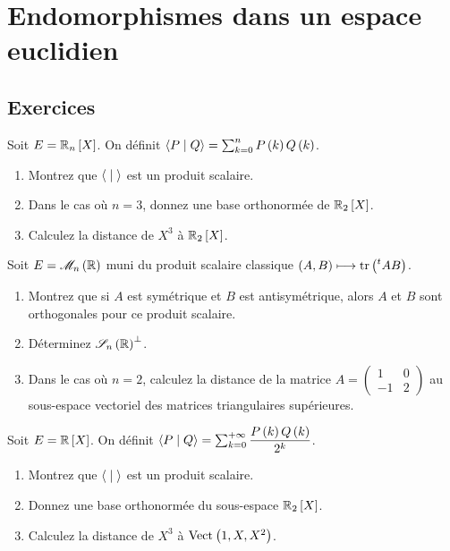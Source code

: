 \chapter{Endomorphismes dans un espace euclidien}

\minitoc

\section*{Exercices}

\legendeexercices

\begin{exos}
Soit \(E=\polydeg[\R]{n}\). On définit \(\left\langle P\;\middle|\; Q\right\rangle=\sum_{k=0}^nP\left(k\right)Q\left(k\right)\).

\begin{enumerate}
    \item Montrez que \(\left\langle\;\middle|\;\right\rangle\) est un produit scalaire. \\
    \item Dans le cas où \(n=3\), donnez une base orthonormée de \(\polydeg[\R]{2}\). \\
    \item Calculez la distance de \(X^3\) à \(\polydeg[\R]{2}\).
\end{enumerate}
\end{exos}

\begin{exos}
Soit \(E=\M{n}[\R]\) muni du produit scalaire classique \(\left(A,B\right)\longmapsto\operatorname{tr}\left(\prescript{t}{}{A}B\right)\).

\begin{enumerate}
    \item Montrez que si \(A\) est symétrique et \(B\) est antisymétrique, alors \(A\) et \(B\) sont orthogonales pour ce produit scalaire. \\
    \item Déterminez \(\sym{n}[\R]\ortho\). \\
    \item Dans le cas où \(n=2\), calculez la distance de la matrice \(A=\begin{pmatrix}
        1 & 0 \\
        -1 & 2
    \end{pmatrix}\) au sous-espace vectoriel des matrices triangulaires supérieures.
\end{enumerate}
\end{exos}

\begin{exoss}
Soit \(E=\poly[\R]\). On définit \(\left\langle P\;\middle|\; Q\right\rangle=\sum_{k=0}^{+\infty}\dfrac{P\left(k\right)Q\left(k\right)}{2^k}\).

\begin{enumerate}
    \item Montrez que \(\left\langle\;\middle|\;\right\rangle\) est un produit scalaire. \\
    \item Donnez une base orthonormée du sous-espace \(\polydeg[\R]{2}\). \\
    \item Calculez la distance de \(X^3\) à \(\Vect{1,X,X^2}\).
\end{enumerate}
\end{exoss}

